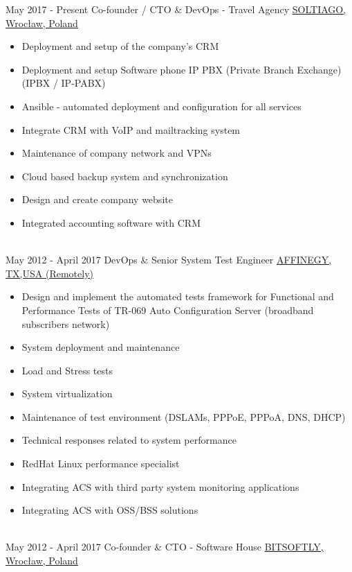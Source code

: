 \documentclass[letterpaper]{tenseconds} %
\begin{document}
\begin{twenty} %
	\twentyitem
	{May 2017 -}
	{Present}
	{Co-founder / CTO \& DevOps - Travel Agency}
	{\href{https://www.soltiago.com/}{SOLTIAGO, Wrocław, Poland}}
	{}
	{\begin{itemize}
		\item Deployment and setup of the company's CRM
		\item Deployment and setup Software phone IP PBX (Private Branch Exchange) (IPBX / IP-PABX)
		\item Ansible - automated deployment and configuration for all services
		\item Integrate CRM with VoIP and mailtracking system
		\item Maintenance of company network and VPNs
		\item Cloud based backup system and synchronization
		\item Design and create company website
		\item Integrated accounting software with CRM
		\end{itemize}}
	\\
	\twentyitem
	{May 2012 -}
	{April 2017}
	{DevOps \& Senior System Test Engineer}
	{\href{https://www.affinegy.com/}{AFFINEGY, TX,USA (Remotely)}}
	{}
	{\begin{itemize}
		\item Design and implement the automated tests framework for Functional and Performance Tests of TR-069 Auto Configuration Server (broadband subscribers network)
		\item System deployment and maintenance
		\item Load and Stress tests
		\item System virtualization
		\item Maintenance of test environment (DSLAMs, PPPoE, PPPoA, DNS, DHCP)
		\item Technical responses related to system performance
		\item RedHat Linux performance specialist
		\item Integrating ACS with third party system monitoring applications
		\item Integrating ACS with OSS/BSS solutions
		\end{itemize}}
	\\
	\twentyitem
	{May 2012 -}
	{April 2017}
	{Co-founder \& CTO - Software House}
	{\href{https://www.bitsoftly.com}{BITSOFTLY, Wrocław, Poland}}
	{}
	{\begin{itemize}

\end{itemize}}
\end{twenty}
\end{document}

